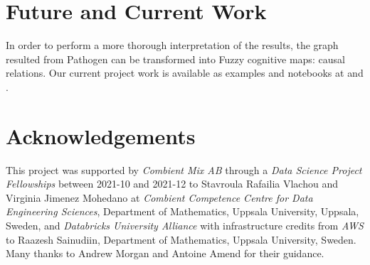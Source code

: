\documentclass[a4, 11pt]{article}
\begin{document}



\section{Future and Current Work}
In order to perform a more thorough interpretation of the results, the graph resulted from Pathogen can be transformed into Fuzzy cognitive maps: causal relations. 
Our current project work is available as examples and notebooks at \cite{TrendCalculusNotebooks} and \cite{PathogenNotebooks}. 


\section{Acknowledgements}

This project was supported by {\em Combient Mix AB} through a {\em Data Science Project Fellowships} between 2021-10 and 2021-12 to Stavroula Rafailia Vlachou and Virginia Jimenez Mohedano at {\em Combient Competence Centre for Data Engineering Sciences}, Department of Mathematics, Uppsala University, Uppsala, Sweden, and {\em Databricks University Alliance} with infrastructure credits from {\em AWS} to Raazesh Sainudiin, Department of Mathematics, Uppsala University, Sweden. Many thanks to Andrew Morgan and Antoine Amend for their guidance.

\nocite{*}
\printbibliography
\end{document}
